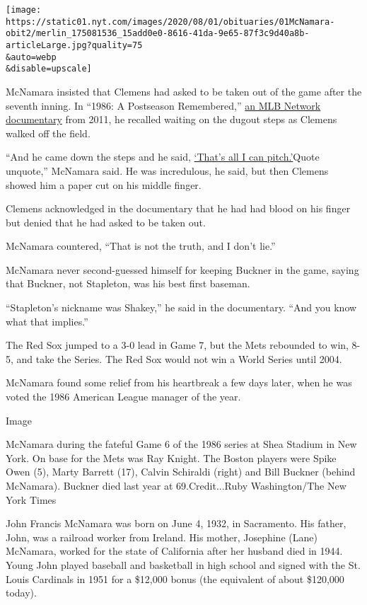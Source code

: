 \texttt{[image: https://static01.nyt.com/images/2020/08/01/obituaries/01McNamara-obit2/merlin\_175081536\_15add0e0-8616-41da-9e65-87f3c9d40a8b-articleLarge.jpg?quality=75\\\&auto=webp\\\&disable=upscale]}

McNamara insisted that Clemens had asked to be taken out of the game
after the seventh inning. In ``1986: A Postseason Remembered,''
\href{https://www.mlb.com/news/network-recalls-1986-postseason/c-25882718\#:~:text=9\%20at\%209\%20p.m.\%20ET,-November\%203\%2C\%202011\&text=After\%20one\%20of\%20the\%20most,9\%20at\%209\%20p.m.\%20ET.}{an
MLB Network documentary} from 2011, he recalled waiting on the dugout
steps as Clemens walked off the field.

``And he came down the steps and he said,
\href{https://www.nytimes.com/2011/11/08/sports/baseball/former-red-sox-manager-john-mcnamara-recalls-final-out-that-wasnt-to-be.html}{`That's
all I can pitch.'}Quote unquote,'' McNamara said. He was incredulous, he
said, but then Clemens showed him a paper cut on his middle finger.

Clemens acknowledged in the documentary that he had had blood on his
finger but denied that he had asked to be taken out.

McNamara countered, ``That is not the truth, and I don't lie.''

McNamara never second-guessed himself for keeping Buckner in the game,
saying that Buckner, not Stapleton, was his best first baseman.

``Stapleton's nickname was Shakey,'' he said in the documentary. ``And
you know what that implies.''

The Red Sox jumped to a 3-0 lead in Game 7, but the Mets rebounded to
win, 8-5, and take the Series. The Red Sox would not win a World Series
until 2004.

McNamara found some relief from his heartbreak a few days later, when he
was voted the 1986 American League manager of the year.

Image

McNamara during the fateful Game 6 of the 1986 series at Shea Stadium in
New York. On base for the Mets was Ray Knight. The Boston players were
Spike Owen (5), Marty Barrett (17), Calvin Schiraldi (right) and Bill
Buckner (behind McNamara). Buckner died last year at 69.Credit...Ruby
Washington/The New York Times

John Francis McNamara was born on June 4, 1932, in Sacramento. His
father, John, was a railroad worker from Ireland. His mother, Josephine
(Lane) McNamara, worked for the state of California after her husband
died in 1944. Young John played baseball and basketball in high school
and signed with the St. Louis Cardinals in 1951 for a \$12,000 bonus
(the equivalent of about \$120,000 today).

